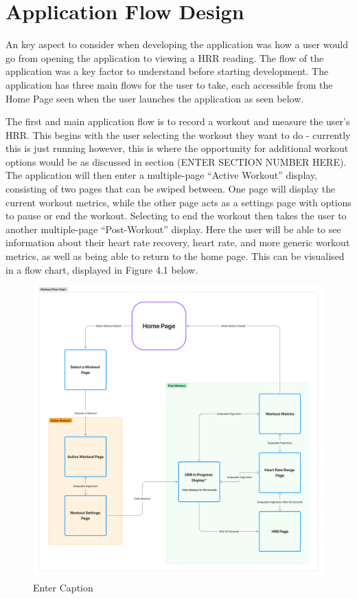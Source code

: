 \documentclass{l4proj}
\begin{document}
\section{Application Flow Design}

An key aspect to consider when developing the application was how a user would go from opening the application to viewing a HRR reading. The flow of the application was a key factor to understand before starting development. The application has three main flows for the user to take, each accessible from the Home Page seen when the user launches the application as seen below.

The first and main application flow is to record a workout and measure the user’s HRR. This begins with the user selecting the workout they want to do - currently this is just running however, this is where the opportunity for additional workout options would be as discussed in section (ENTER SECTION NUMBER HERE). The application will then enter a multiple-page “Active Workout” display, consisting of two pages that can be swiped between. One page will display the current workout metrics, while the other page acts as a settings page with options to pause or end the workout. Selecting to end the workout then takes the user to another multiple-page “Post-Workout” display. Here the user will be able to see information about their heart rate recovery, heart rate, and more generic workout metrics, as well as being able to return to the home page. This can be visualised in a flow chart, displayed in Figure 4.1 below.

\begin{figure}[h!]
    \centering
    \includegraphics[width=0.75\linewidth]{dissertation//dissImages/WorkoutFlow.pdf}
    \caption{Enter Caption}
    \label{fig:enter-label}
\end{figure}
\end{document}
